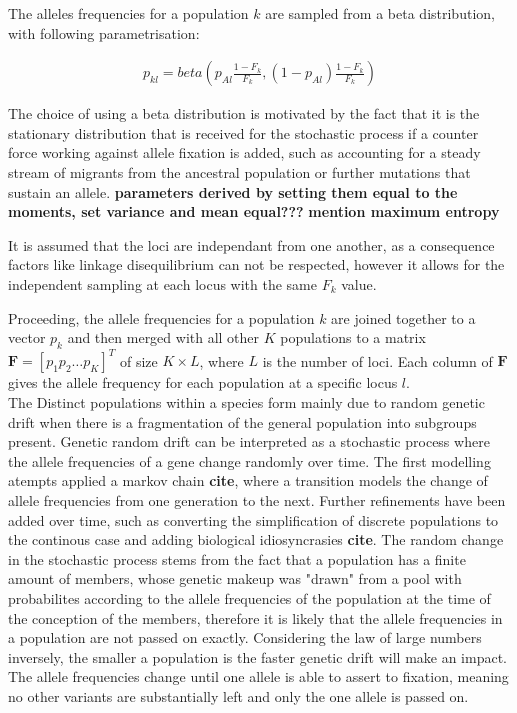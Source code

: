 \documentclass[a4paper, 11pt]{article}
\begin{document}
The alleles frequencies for a population $k$ are sampled from a beta distribution, with following parametrisation:

\begin{align}
p_{kl} = beta(p_{Al} \frac{1 - F_k}{F_k}, (1-p_{Al}) \frac{1 - F_k}{F_k})
\end{align}

The choice of using a beta distribution is motivated by the fact that it is the stationary distribution that is received for the stochastic process if a counter force working against allele fixation is added, such as accounting for a steady stream of migrants from the ancestral population or further mutations that sustain an allele. \textbf{parameters derived by setting them equal to the moments, set variance and mean equal???}
\textbf{mention maximum entropy}

\parencite{balding2003likelihood} 

It is assumed that the loci are independant from one another, as a consequence factors like linkage disequilibrium can not be respected, however it allows for the independent sampling at each locus with the same $F_k$ value.

Proceeding, the allele frequencies for a population $k$ are joined together to a vector $p_k$ and then merged with all other $K$ populations to a matrix $\mathbf{F} = [p_1 p_2 \ldots p_K]^T$ of size $K \times L$, where $L$ is the number of loci. Each column of $\mathbf{F}$ gives the allele frequency for each population at a specific locus $l$.\\

The Distinct populations within a species form mainly due to random genetic drift when there is a fragmentation of the general population into subgroups present. Genetic random drift can be interpreted as a stochastic process where the allele frequencies of a gene change randomly over time. The first modelling atempts applied a markov chain \textbf{cite}, where a transition models the change of allele frequencies from one generation to the next. Further refinements have been added over time, such as converting the simplification of discrete populations to the continous case and adding biological idiosyncrasies \textbf{cite}. The random change in the stochastic process stems from the fact that a population has a finite amount of members, whose genetic makeup was "drawn" from a pool with probabilites according to the allele frequencies of the population at the time of the conception of the members, therefore it is likely that the allele frequencies in a population are not passed on exactly. Considering the law of large numbers inversely, the smaller a population is the faster genetic drift will make an impact. The allele frequencies change until one allele is able to assert to fixation, meaning no other variants are substantially left and only the one allele is passed on. \\
\end{document}
